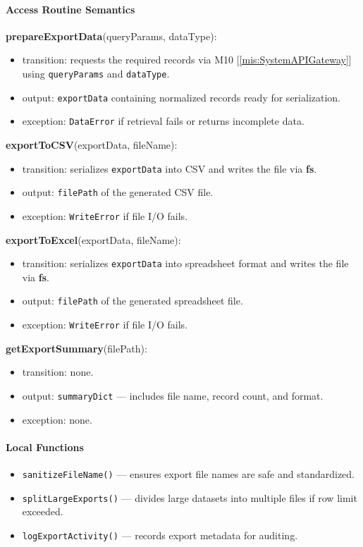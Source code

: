 \documentclass[12pt, titlepage]{article}
\begin{document}
\begin{itemize}
  \paragraph{Access Routine Semantics}

  \noindent \textbf{prepareExportData}(queryParams, dataType):
  \begin{itemize}
    \item transition: requests the required records via M10 [\ref{mis:SystemAPIGateway}] using \texttt{queryParams} and \texttt{dataType}.
    \item output: \texttt{exportData} containing normalized records ready for serialization.
    \item exception: \texttt{DataError} if retrieval fails or returns incomplete data.
  \end{itemize}

  \noindent \textbf{exportToCSV}(exportData, fileName):
  \begin{itemize}
    \item transition: serializes \texttt{exportData} into CSV and writes the file via \textbf{fs}.
    \item output: \texttt{filePath} of the generated CSV file.
    \item exception: \texttt{WriteError} if file I/O fails.
  \end{itemize}

  \noindent \textbf{exportToExcel}(exportData, fileName):
  \begin{itemize}
    \item transition: serializes \texttt{exportData} into spreadsheet format and writes the file via \textbf{fs}.
    \item output: \texttt{filePath} of the generated spreadsheet file.
    \item exception: \texttt{WriteError} if file I/O fails.
  \end{itemize}


  \noindent \textbf{getExportSummary}(filePath):
  \begin{itemize}
    \item transition: none.
    \item output: \texttt{summaryDict} — includes file name, record count, and format.
    \item exception: none.
  \end{itemize}

  \paragraph{Local Functions}
  \begin{itemize}
    \item \texttt{sanitizeFileName()} — ensures export file names are safe and standardized.
    \item \texttt{splitLargeExports()} — divides large datasets into multiple files if row limit exceeded.
    \item \texttt{logExportActivity()} — records export metadata for auditing.
  \end{itemize}



\end{itemize}
\end{document}
